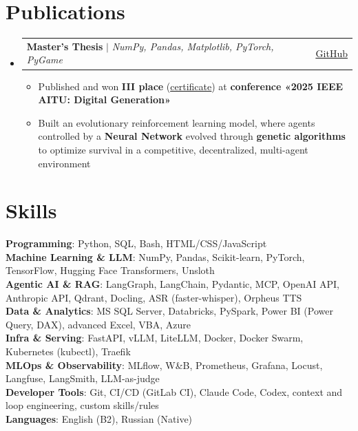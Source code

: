 \documentclass[letterpaper,11pt]{article}
\makeatletter
\newcommand{\resumeItem}[1]{
  \item\small{
    {#1 \vspace{-2pt}}
  }
}
\newcommand{\resumeProjectHeading}[2]{
    \item
    \begin{tabular*}{0.97\textwidth}{l@{\extracolsep{\fill}}r}
      \small#1 & #2 \\
    \end{tabular*}\vspace{-7pt}
}
\newcommand{\resumeSubHeadingListStart}{\begin{itemize}[leftmargin=0.15in, label={}]}
\newcommand{\resumeSubHeadingListEnd}{\end{itemize}}
\newcommand{\resumeItemListStart}{\begin{itemize}}
\newcommand{\resumeItemListEnd}{\end{itemize}\vspace{-5pt}}
\makeatother
\begin{document}
\section{Publications}
  \resumeSubHeadingListStart
    \resumeProjectHeading
        {\textbf{Master's Thesis} $|$ \emph{NumPy, Pandas, Matplotlib, PyTorch, PyGame}}{\href{https://github.com/sovetskiysn/Digital-aquarium}{\underline{GitHub}}}
        \resumeItemListStart
          \resumeItem{Published and won \textbf{III place} (\href{https://raw.githubusercontent.com/sovetskiysn/Digital-aquarium/refs/heads/main/assets/certificate.jpg}{\underline{certificate}}) at \textbf{conference «2025 IEEE AITU: Digital Generation»}}
          \resumeItem{Built an evolutionary reinforcement learning model, where agents controlled by a \textbf{Neural Network} evolved through \textbf{genetic algorithms} to optimize survival in a competitive, decentralized, multi-agent environment}
        \resumeItemListEnd
  \resumeSubHeadingListEnd


\section{Skills}
 \begin{itemize}[leftmargin=0.15in, label={}]
    \small{\item{
     \textbf{Programming}{: Python, SQL, Bash, HTML/CSS/JavaScript} \\
     \textbf{Machine Learning \& LLM}{: NumPy, Pandas, Scikit-learn, PyTorch, TensorFlow, Hugging Face Transformers, Unsloth} \\
     \textbf{Agentic AI \& RAG}{: LangGraph, LangChain, Pydantic, MCP, OpenAI API, Anthropic API, Qdrant, Docling, ASR (faster-whisper), Orpheus TTS} \\
     \textbf{Data \& Analytics}{: MS SQL Server, Databricks, PySpark, Power BI (Power Query, DAX), advanced Excel, VBA, Azure} \\
     \textbf{Infra \& Serving}{: FastAPI, vLLM, LiteLLM, Docker, Docker Swarm, Kubernetes (kubectl), Traefik} \\
     \textbf{MLOps \& Observability}{: MLflow, W\&B, Prometheus, Grafana, Locust, Langfuse, LangSmith, LLM-as-judge} \\
     \textbf{Developer Tools}{: Git, CI/CD (GitLab CI), Claude Code, Codex, context and loop engineering, custom skills/rules} \\
     \textbf{Languages}{: English (B2), Russian (Native)}
    }}
 \end{itemize}
\end{document}
